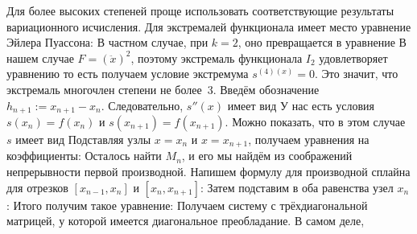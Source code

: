 \documentclass[a4paper]{article}
\begin{document}
Для более высоких степеней проще использовать соответствующие
результаты вариационного исчисления. Для экстремалей функционала
имеет место уравнение Эйлера Пуассона:   В частном случае, при $k = 2$, оно превращается в уравнение
В нашем случае $F = (\ddot x)^2$, поэтому экстремаль функционала $I_2$
удовлетворяет уравнению  то есть
получаем условие экстремума $s^{(4)(x)} = 0$. Это значит, что
экстремаль многочлен степени не более~3.  Введём обозначение $h_{n+1}
:= x_{n+1} - x_n$.  Следовательно, $s''(x)$ имеет вид   У
нас есть условия $s(x_n) = f(x_n)$ и $s(x_{n+1}) = f(x_{n+1})$. Можно
показать, что в этом случае $s$ имеет вид   Подставляя узлы $x = x_n$ и $x = x_{n+1}$,
получаем уравнения на коэффициенты:   Осталось найти $M_n$, и его мы найдём из соображений
непрерывности первой производной.  Напишем формулу для производной
сплайна для отрезков $[x_{n-1},x_n]$ и $[x_n,x_{n+1}]$:   Затем подставим в оба равенства узел $x_n$:
  Итого получим такое
уравнение: 
Получаем систему с трёхдиагональной матрицей, у которой имеется
диагональное преобладание.  В самом деле, 
\end{document}
